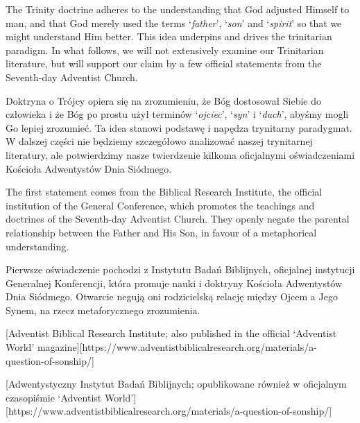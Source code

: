 The Trinity doctrine adheres to the understanding that God adjusted Himself to man, and that God merely used the terms ‘\textit{father}’, ‘\textit{son}’ and ‘\textit{spirit}’ so that we might understand Him better. This idea underpins and drives the trinitarian paradigm. In what follows, we will not extensively examine our Trinitarian literature, but will support our claim by a few official statements from the Seventh-day Adventist Church.


Doktryna o Trójcy opiera się na zrozumieniu, że Bóg dostosował Siebie do człowieka i że Bóg po prostu użył terminów ‘\textit{ojciec}’, ‘\textit{syn}’ i ‘\textit{duch}’, abyśmy mogli Go lepiej zrozumieć. Ta idea stanowi podstawę i napędza trynitarny paradygmat. W dalszej części nie będziemy szczegółowo analizować naszej trynitarnej literatury, ale potwierdzimy nasze twierdzenie kilkoma oficjalnymi oświadczeniami Kościoła Adwentystów Dnia Siódmego.


The first statement comes from the Biblical Research Institute, the official institution of the General Conference, which promotes the teachings and doctrines of the Seventh-day Adventist Church. They openly negate the parental relationship between the Father and His Son, in favour of a metaphorical understanding.


Pierwsze oświadczenie pochodzi z Instytutu Badań Biblijnych, oficjalnej instytucji Generalnej Konferencji, która promuje nauki i doktryny Kościoła Adwentystów Dnia Siódmego. Otwarcie negują oni rodzicielską relację między Ojcem a Jego Synem, na rzecz metaforycznego zrozumienia.


[Adventist Biblical Research Institute; also published in the official ‘Adventist World’ magazine][https://www.adventistbiblicalresearch.org/materials/a-question-of-sonship/]


[Adwentystyczny Instytut Badań Biblijnych; opublikowane również w oficjalnym czasopiśmie ‘Adventist World’][https://www.adventistbiblicalresearch.org/materials/a-question-of-sonship/]



